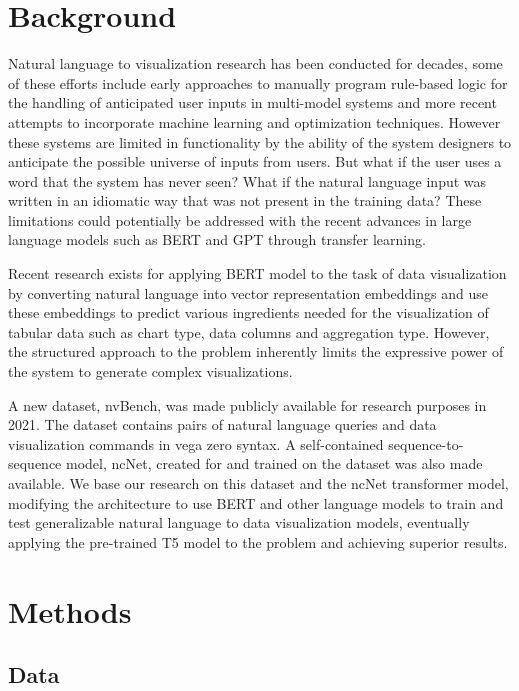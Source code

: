 \documentclass[
	a4paper, %
	10pt, %
	unnumberedsections, %
	twoside, %
]{t0003}
\begin{document}
\section{Background}

Natural language to visualization research has been conducted for decades, some of these efforts include early approaches to manually program rule-based logic for the handling of anticipated user inputs in multi-model systems\cite{Cox:2001qr} and more recent attempts to incorporate machine learning and optimization techniques\cite{Aurisano:2016qr}. However these systems are limited in functionality by the ability of the system designers to anticipate the possible universe of inputs from users. But what if the user uses a word that the system has never seen? What if the natural language input was written in an idiomatic way that was not present in the training data? These limitations could potentially be addressed with the recent advances in large language models such as BERT and GPT through transfer learning.

Recent research exists for applying BERT model to the task of data visualization\cite{Can:2021qr} by converting natural language into vector representation embeddings and use these embeddings to predict various ingredients needed for the visualization of tabular data such as chart type, data columns and aggregation type. However, the structured approach to the problem inherently limits the expressive power of the system to generate complex visualizations.

A new dataset, nvBench\cite{Luo:2021qr}, was made publicly available for research purposes in 2021. The dataset contains pairs of natural language queries and data visualization commands in vega zero syntax\cite{Luo:2022qr}. A self-contained sequence-to-sequence model, ncNet\cite{Luo:2022qr}, created for and trained on the dataset was also made available. We base our research on this dataset and the ncNet transformer model, modifying the architecture to use BERT and other language models to train and test generalizable natural language to data visualization models, eventually applying the pre-trained T5 model to the problem and achieving superior results.

\section{Methods}

\subsection{Data}
\end{document}
